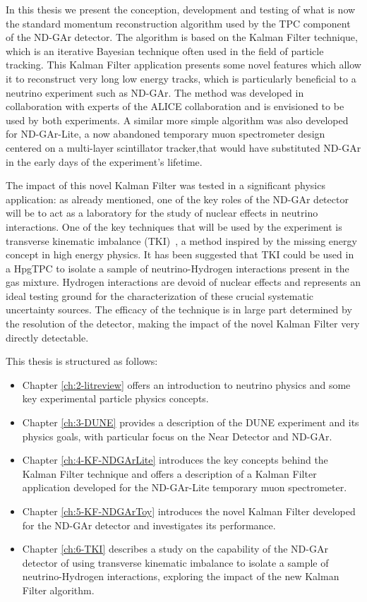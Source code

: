 In this thesis we present the conception, development and testing of what is now the standard momentum reconstruction algorithm used by the TPC component of the ND-GAr detector. The algorithm is based on the Kalman Filter technique, which is an iterative Bayesian technique often used in the field of particle tracking. This Kalman Filter application presents some novel features which allow it to reconstruct very long low energy tracks, which is particularly beneficial to a neutrino experiment such as ND-GAr. The method was developed in collaboration with experts of the ALICE collaboration and is envisioned to be used by both experiments. A similar more simple algorithm was also developed for ND-GAr-Lite, a now abandoned temporary muon spectrometer design centered on a multi-layer scintillator tracker,that would have substituted ND-GAr in the early days of the experiment's lifetime.

The impact of this novel Kalman Filter was tested in a significant physics application: as already mentioned, one of the key roles of the ND-GAr detector will be to act as a laboratory for the study of nuclear effects in neutrino interactions. One of the key techniques that will be used by the experiment is transverse kinematic imbalance (TKI)~\cite{Lu:2015hea, PhysRevC.94.015503, PhysRevC.99.055504, Cai:2019jzk, PhysRevD.102.033005}, a method inspired by the missing energy concept in high energy physics. It has been suggested that TKI could be used in a HpgTPC to isolate a sample of neutrino-Hydrogen interactions present in the gas mixture. Hydrogen interactions are devoid of nuclear effects and represents an ideal testing ground for the characterization of these crucial systematic uncertainty sources. The efficacy of the technique is in large part determined by the resolution of the detector, making the impact of the novel Kalman Filter very directly detectable.

This thesis is structured as follows:
\begin{itemize}
    \item Chapter \ref{ch:2-litreview} offers an introduction to neutrino physics and some key experimental particle physics concepts.
    \item Chapter \ref{ch:3-DUNE} provides a description of the DUNE experiment and its physics goals, with particular focus on the Near Detector and ND-GAr.
    \item Chapter \ref{ch:4-KF-NDGArLite} introduces the key concepts behind the Kalman Filter technique and offers a description of a Kalman Filter application developed for the ND-GAr-Lite temporary muon spectrometer.
    \item Chapter \ref{ch:5-KF-NDGArToy} introduces the novel Kalman Filter developed for the ND-GAr detector and investigates its performance.
    \item Chapter \ref{ch:6-TKI} describes a study on the capability of the ND-GAr detector of using transverse kinematic imbalance to isolate a sample of neutrino-Hydrogen interactions, exploring the impact of the new Kalman Filter algorithm.
\end{itemize}








